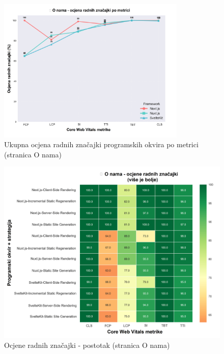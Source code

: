 \begin{figure}[H]
    \centering
    \includegraphics[width=0.8\textwidth]{slike/rezultati/about/about_performance_by_metric.png}
    \caption{Ukupna ocjena radnih značajki programskih okvira po metrici (stranica O nama)}
    \label{fig:testiranje-o-nama-performanse-po-metrici}
\end{figure}

\begin{figure}[H]
    \centering
    \includegraphics[width=\textwidth]{slike/rezultati/about/about_performance_scores.png}
    \caption{Ocjene radnih značajki - postotak (stranica O nama)}
    \label{fig:testiranje-o-nama-postotak}
\end{figure}

